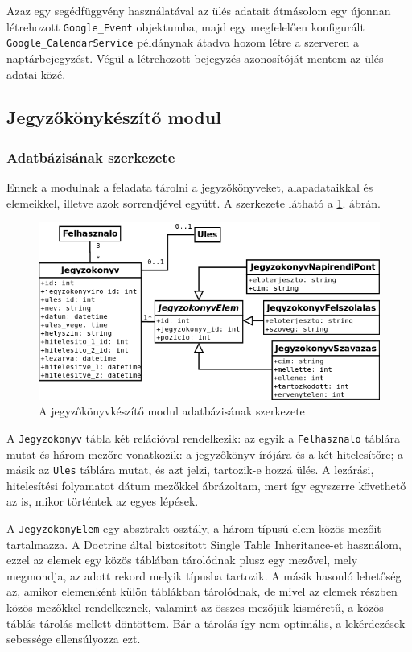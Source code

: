 \documentclass[a4paper,12pt,oneside]{report}
\begin{document}
Azaz egy segédfüggvény használatával az ülés adatait átmásolom egy újonnan létrehozott {\tt Google\_Event} objektumba, majd egy megfelelően konfigurált {\tt Google\_CalendarService} példánynak átadva hozom létre a szerveren a naptárbejegyzést. Végül a létrehozott bejegyzés azonosítóját mentem az ülés adatai közé.

\subsection{Jegyzőkönykészítő modul}

\subsubsection*{Adatbázisának szerkezete}

Ennek a modulnak a feladata tárolni a jegyzőkönyveket, alapadataikkal és elemeikkel, illetve azok sorrendjével együtt. A szerkezete látható a \ref{fig:jegyzokonyv_db}. ábrán.

\begin{figure}[h]
    \includegraphics[width=\textwidth]{jegyzokonyv_db.png}
    \caption{A jegyzőkönyvkészítő modul adatbázisának szerkezete}
    \label{fig:jegyzokonyv_db}
\end{figure}

A {\tt Jegyzokonyv} tábla két relációval rendelkezik: az egyik a {\tt Felhasznalo} táblára mutat és három mezőre vonatkozik: a jegyzőkönyv írójára és a két hitelesítőre; a másik az {\tt Ules} táblára mutat, és azt jelzi, tartozik-e hozzá ülés. A lezárási, hitelesítési folyamatot dátum mezőkkel ábrázoltam, mert így egyszerre követhető az is, mikor történtek az egyes lépések.

A {\tt JegyzokonyElem} egy absztrakt osztály, a három típusú elem közös mezőit tartalmazza. A Doctrine által biztosított Single Table Inheritance-et használom, ezzel az elemek egy közös táblában tárolódnak plusz egy mezővel, mely megmondja, az adott rekord melyik típusba tartozik. A másik hasonló lehetőség az, amikor elemenként külön táblákban tárolódnak, de mivel az elemek részben közös mezőkkel rendelkeznek, valamint az összes mezőjük kisméretű, a közös táblás tárolás mellett döntöttem. Bár a tárolás így nem optimális, a lekérdezések sebessége ellensúlyozza ezt.
\end{document}
